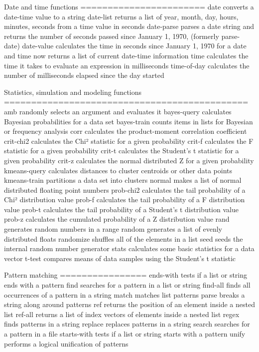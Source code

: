 \documentclass[cn,11pt]{elegantbook}
\begin{document}
Date and time functions
=======================
date              converts a date-time value to a string
date-list         returns a list of year, month, day, hours, minutes, seconds from a time value in seconds
date-parse        parses a date string and returns the number of seconds passed since January 1, 1970, (formerly parse-date)
date-value        calculates the time in seconds since January 1, 1970 for a date and time
now               returns a list of current date-time information
time              calculates the time it takes to evaluate an expression in milliseconds
time-of-day       calculates the number of milliseconds elapsed since the day started

Statistics, simulation and modeling functions
=============================================
amb               randomly selects an argument and evaluates it
bayes-query       calculates Bayesian probabilities for a data set
bayes-train       counts items in lists for Bayesian or frequency analysis
corr              calculates the product-moment correlation coefficient
crit-chi2         calculates the Chi² statistic for a given probability
crit-f            calculates the F statistic for a given probability
crit-t            calculates the Student's t statistic for a given probability
crit-z            calculates the normal distributed Z for a given probability
kmeans-query      calculates distances to cluster centroids or other data points
kmeans-train      partitions a data set into clusters
normal            makes a list of normal distributed floating point numbers
prob-chi2         calculates the tail probability of a Chi² distribution value
prob-f            calculates the tail probability of a F distribution value
prob-t            calculates the tail probability of a Student's t distribution value
prob-z            calculates the cumulated probability of a Z distribution value
rand              generates random numbers in a range
random            generates a list of evenly distributed floats
randomize         shuffles all of the elements in a list
seed              seeds the internal random number generator
stats             calculates some basic statistics for a data vector
t-test            compares means of data samples using the Student's t statistic

Pattern matching
================
ends-with         tests if a list or string ends with a pattern
find              searches for a pattern in a list or string
find-all          finds all occurrences of a pattern in a string
match             matches list patterns
parse             breaks a string along around patterns
ref               returns the position of an element inside a nested list
ref-all           returns a list of index vectors of elements inside a nested list
regex             finds patterns in a string
replace           replaces patterns in a string
search            searches for a pattern in a file
starts-with       tests if a list or string starts with a pattern
unify             performs a logical unification of patterns
\end{document}
